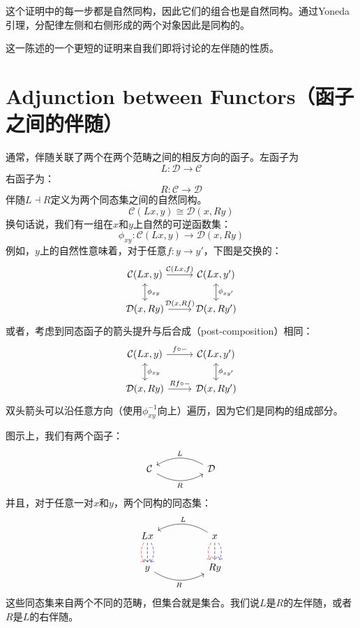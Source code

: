 \documentclass[DaoFP]{subfiles}
\begin{document}
    这个证明中的每一步都是自然同构，因此它们的组合也是自然同构。通过Yoneda引理，分配律左侧和右侧形成的两个对象因此是同构的。

    这一陈述的一个更短的证明来自我们即将讨论的左伴随的性质。

    \section{Adjunction between Functors（函子之间的伴随）}

    通常，伴随关联了两个在两个范畴之间的相反方向的函子。左函子为
    \[ L \colon \mathcal{D} \to \mathcal{C}\]
    右函子为：
    \[ R \colon \mathcal{C} \to  \mathcal{D} \]
    伴随$L \dashv R$定义为两个同态集之间的自然同构。
    \[  \mathcal{C} (L x, y) \cong \mathcal{D}( x , R y)\]
    换句话说，我们有一组在$x$和$y$上自然的可逆函数集：
    \[ \phi_{x y} \colon  \mathcal{C} (L x, y) \to \mathcal{D}( x , R y) \]
    例如，$y$上的自然性意味着，对于任意$f \colon y \to y'$，下图是交换的：
    \[
        \begin{tikzcd}
            \mathcal{C}(L x, y)
            \arrow[d, leftrightarrow, "\phi_{x y}"]
            \arrow[r, "{\mathcal{C}(L x, f)}"]
            &
            \mathcal{C}(L x, y')
            \arrow[d, leftrightarrow, "\phi_{x y'}"]
            \\
            \mathcal{D}(x, R y)
            \arrow[r, "{\mathcal{D}(x, R f)}"]
            & \mathcal{D}(x, R y')
        \end{tikzcd}
    \]
    或者，考虑到同态函子的箭头提升与后合成（post-composition）相同：
    \[
        \begin{tikzcd}
            \mathcal{C}(L x, y)
            \arrow[d, leftrightarrow, "\phi_{x y}"]
            \arrow[r, "f \circ -"]
            &
            \mathcal{C}(L x, y')
            \arrow[d, leftrightarrow, "\phi_{x y'}"]
            \\
            \mathcal{D}(x, R y)
            \arrow[r, "R f \circ -"]
            & \mathcal{D}(x, R y')
        \end{tikzcd}
    \]
    双头箭头可以沿任意方向（使用$\phi^{-1}_{x y}$向上）遍历，因为它们是同构的组成部分。

    图示上，我们有两个函子：
    \[
        \begin{tikzcd}
            \mathcal{C}
            \arrow[rr, bend right, "R"']
            &&
            \mathcal{D}
            \arrow[ll, bend right, "L"']
        \end{tikzcd}
    \]
    并且，对于任意一对$x$和$y$，两个同构的同态集：
    \[
        \begin{tikzcd}
            L x
            \arrow[d, bend right, red, dashed]
            \arrow[d, dashed]
            \arrow[d, bend left, blue, dashed]
            &&
            x
            \arrow[d, bend right, red, dashed]
            \arrow[d, dashed]
            \arrow[d, bend left, blue, dashed]
            \arrow[ll, bend right, "L"']
            \\
            y
            \arrow[rr, bend right, "R"']
            &&
            R y
        \end{tikzcd}
    \]
    这些同态集来自两个不同的范畴，但集合就是集合。我们说$L$是$R$的左伴随，或者$R$是$L$的右伴随。
\end{document}
